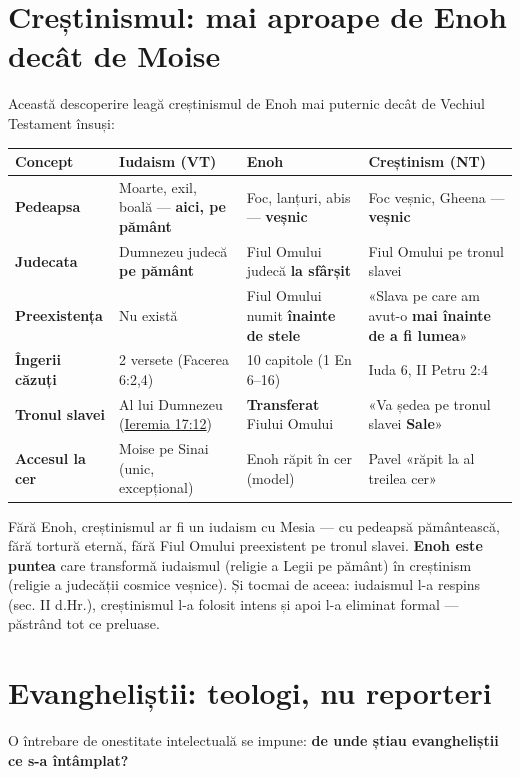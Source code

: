 \documentclass[12pt,a4paper,twoside,openany]{book}
\begin{document}
\chapter{Creștinismul: mai aproape de Enoh decât de Moise}\label{crest-enoh}
Această descoperire leagă creștinismul de Enoh mai puternic decât de Vechiul Testament însuși:

\begin{center}
\small
\begin{tabular}{L{1.5cm}L{4.0cm}L{3.6cm}L{5.5cm}}
\toprule
{}
\textbf{Concept} & \textbf{Iudaism (VT)} & \textbf{Enoh} & \textbf{Creștinism (NT)} \\
\midrule
\textbf{Pedeapsa} & Moarte, exil, boală — \textbf{aici, pe pământ} & Foc, lanțuri, abis — \textbf{veșnic} & Foc veșnic, Gheena — \textbf{veșnic} \\
\textbf{Judecata} & Dumnezeu judecă \textbf{pe pământ} & Fiul Omului judecă \textbf{la sfârșit} & Fiul Omului pe tronul slavei \\
\textbf{Preexistența} & Nu există & Fiul Omului numit \textbf{înainte de stele} & «Slava pe care am avut-o \textbf{mai înainte de a fi lumea}» \\
\textbf{Îngerii căzuți} & 2 versete (Facerea 6:2,4) & 10 capitole (1 En 6–16) & Iuda 6, II Petru 2:4 \\
\textbf{Tronul slavei} & Al lui Dumnezeu (\href{https://bibliaortodoxa.ro/carte.php?id=31\&cap=17\#12}{Ieremia 17:12}) & \textbf{Transferat} Fiului Omului & «Va ședea pe tronul slavei \textbf{Sale}» \\
\textbf{Accesul la cer} & Moise pe Sinai (unic, excepțional) & Enoh răpit în cer (model) & Pavel «răpit la al treilea cer» \\
\bottomrule
\end{tabular}
\end{center}
\normalsize
Fără Enoh, creștinismul ar fi un iudaism cu Mesia — cu pedeapsă pământească, fără tortură eternă, fără Fiul Omului preexistent pe tronul slavei. \textbf{Enoh este puntea} care transformă iudaismul (religie a Legii pe pământ) în creștinism (religie a judecății cosmice veșnice). Și tocmai de aceea: iudaismul l-a respins (sec. II d.Hr.), creștinismul l-a folosit intens și apoi l-a eliminat formal — păstrând tot ce preluase.


\chapter{Evangheliștii: teologi, nu reporteri}\label{teologi}
O întrebare de onestitate intelectuală se impune: \textbf{de unde știau evangheliștii ce s-a întâmplat?}
\end{document}
